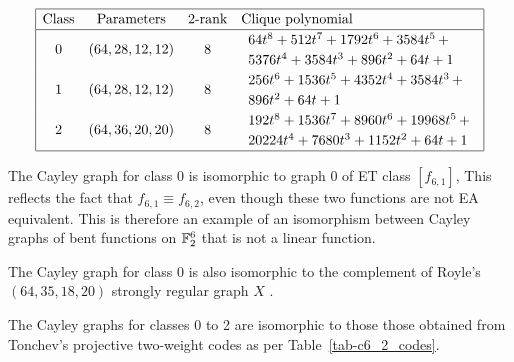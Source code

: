 \begin{table}[!bhpt] %
%
\small{}
\begin{align*}
\def\arraystretch{1.2}
\begin{array}{|cccl|}
\hline
\text{Class} &
\text{Parameters} &
\text{2-rank} &
\text{Clique polynomial}
\\
\hline
0 &
(64, 28, 12, 12) &
8 &
\begin{array}{l}
64t^{8} + 512t^{7} + 1792t^{6} + 3584t^{5}
\,+
\\
 5376t^{4} + 3584t^{3} + 896t^{2} + 64t + 1
\end{array}
\\
1 &
(64, 28, 12, 12) &
8 &
\begin{array}{l}
256t^{6} + 1536t^{5} + 4352t^{4} + 3584t^{3}
\,+
\\
 896t^{2} + 64t + 1
\end{array}
\\
2 &
(64, 36, 20, 20) &
8 &
\begin{array}{l}
192t^{8} + 1536t^{7} + 8960t^{6} + 19968t^{5}
\,+
\\
 20224t^{4} + 7680t^{3} + 1152t^{2} + 64t + 1
\end{array}
\\
\hline
\end{array}
\end{align*}
%
\caption{$[f_{6,2}]$ extended Cayley classes.}
\label{tab-c6_2_EC_classes}
\end{table}

The Cayley graph for class 0 is isomorphic to graph 0 of ET class $[f_{6,1}]$,
This reflects the fact that $f_{6,1} \equiv f_{6,2}$, even though these two functions are not
EA equivalent.
This is therefore an example of an isomorphism between Cayley graphs of bent functions on
$\mathbb{F}_2^6$ that is not a linear function.

The Cayley graph for class 0 is also isomorphic to the complement of Royle's $(64,35,18,20)$ strongly regular graph $X$
\cite{Roy08normal}.

%
%

The Cayley graphs for classes 0 to 2 are isomorphic to those those obtained from
Tonchev's projective two-weight codes \cite{Ton07codes} as per Table~\ref{tab-c6_2_codes}.

